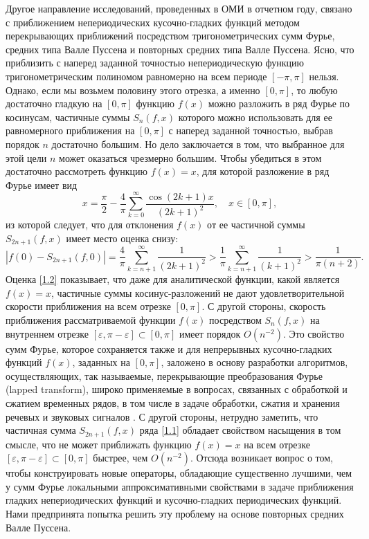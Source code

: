 Другое направление исследований, проведенных в ОМИ в отчетном году, связано с приближением непериодических кусочно-гладких функций методом перекрывающих приближений посредством тригонометрических сумм Фурье, средних типа Валле Пуссена и повторных средних типа Валле Пуссена.
Ясно, что приблизить с наперед заданной точностью  непериодическую функцию тригонометрическим полиномом  равномерно на всем периоде $[-\pi,\pi]$ нельзя. Однако, если мы возьмем половину этого отрезка, а именно  $[0,\pi]$, то любую достаточно гладкую на $[0,\pi]$ функцию $f(x)$ можно разложить в ряд Фурье по косинусам,
частичные суммы $S_n(f,x)$ которого можно использовать для ее равномерного  приближения на $[0,\pi]$ с наперед заданной точностью, выбрав порядок $n$ достаточно большим. Но дело заключается в том, что выбранное для этой цели $n$ может оказаться чрезмерно большим. Чтобы убедиться в этом достаточно рассмотреть функцию $f(x)=x$,  для которой разложение в ряд Фурье имеет вид
\begin{equation}\label{1.1}
x=\frac{\pi}{2}-\frac{4}{\pi}\sum_{k=0}^\infty\frac{\cos(2k+1)x}{(2k+1)^2}, \quad x\in [0,\pi],
\end{equation}
 из которой следует, что для отклонения  $f(x)$ от ее частичной суммы $S_{2n+1}(f,x)$ имеет место оценка снизу:
\begin{equation}\label{1.2}
|f(0)-S_{2n+1}(f,0)|=\frac{4}{\pi}\sum_{k=n+1}^\infty\frac{1}{(2k+1)^2}>
\frac{1}{\pi}\sum_{k=n+1}^\infty\frac{1}{(k+1)^2}>\frac{1}{\pi(n+2)}.
\end{equation}
Оценка \eqref{1.2} показывает, что даже для аналитической функции, какой является $f(x)=x$,
частичные суммы косинус-разложений не дают удовлетворительной скорости приближения на всем отрезке $[0,\pi]$. С другой стороны, скорость приближения рассматриваемой функции $f(x)$ посредством $S_{n}(f,x)$ на внутреннем отрезке  $[\varepsilon,\pi-\varepsilon]\subset[0,\pi]$ имеет порядок $O(n^{-2})$. Это свойство сумм Фурье, которое сохраняется  также и для непрерывных кусочно-гладких функций $f(x)$, заданных на $[0,\pi]$, заложено в основу разработки алгоритмов, осуществляющих, так называемые, перекрывающие преобразования Фурье (lapped transform), широко применяемые в вопросах, связанных с обработкой и сжатием временных рядов, в том числе в задаче обработки, сжатия и хранения речевых и звуковых сигналов \cite{LapVPMalvar}. С другой стороны, нетрудно заметить, что частичная сумма $S_{2n+1}(f,x)$ ряда \eqref{1.1} обладает свойством насыщения в том смысле, что не может приближать функцию $f(x)=x$ на всем отрезке  $[\varepsilon,\pi-\varepsilon]\subset[0,\pi]$ быстрее, чем $O(n^{-2})$. Отсюда возникает вопрос о том, чтобы конструировать новые операторы, обладающие существенно лучшими, чем у сумм Фурье  локальными аппроксимативными свойствами в задаче приближения гладких непериодических функций и кусочно-гладких периодических функций. Нами предпринята попытка решить эту проблему на основе повторных средних  Валле Пуссена.




